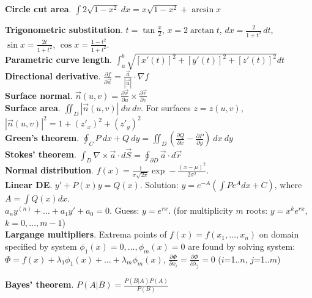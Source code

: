 \documentclass[a4paper, 12pt]{article}
\newcommand{\Topic}[1]{\textbf{#1}}
\begin{document}
\Topic{Circle cut area}.
$\int 2\sqrt{1-x^2}\ dx = x \sqrt{1-x^2} + \arcsin x$

\Topic{Trigonometric substitution}.
$t = \tan \frac{x}{2}$, $x = 2 \arctan t$, $dx = \frac{2}{1 + t^2}\,dt$,
$\sin x = \frac{2t}{1 + t^2}$, $\cos x = \frac{1 - t^2}{1 + t^2}$. \\
\Topic{Parametric curve length}.
$\int_a^b \sqrt{[x'(t)]^2 + [y'(t)]^2 + [z'(t)]^2} dt$ \\
\Topic{Directional derivative}.
$\frac{\partial f}{\partial \vec{a}} = \frac{\vec{a}}{|\vec{a}|} \cdot \nabla f$ \\
\Topic{Surface normal}.
$\vec{n}(u, v) = \frac{\partial \vec{r}}{\partial u} \times
                 \frac{\partial \vec{r}}{\partial v}$ \\
\Topic{Surface area}.
$\iint_D |\vec{n}(u,v)|\ du\ dv$.
For surfaces $z=z(u,v)$, $|\vec{n}(u,v)|^2 = {1 + (z'_x)^2 + (z'_y)^2}$ \\
\Topic{Green's theorem}.
$\oint_C P\ dx + Q\ dy =
\iint_D (\frac{\partial Q}{\partial x} - \frac{\partial P}{\partial y})\ dx\ dy$ \\
\Topic{Stokes' theorem}.
$\int_D \nabla \times \vec{a} \cdot d\vec{S} =
 \oint_{\partial D} \vec{a} \cdot d\vec{r}$ \\
\Topic{Normal distribution}.
$f(x) = \frac{1}{\sigma \sqrt{2\pi}} \exp -\frac{(x - \mu)^2}{2 \sigma^2}$. \\
\Topic{Linear DE}.
$y' + P(x) y = Q(x)$.
Solution: $y = e^{-A} (\int P e^A dx + C)$, where $A = \int Q(x) dx$. \\
$a_n y^{(n)} + \dots + a_1 y' + a_0 = 0$.  Guess: $y=e^{rx}$.
(for multiplicity $m$ roots: $y=x^k e^{rx}$, $k=0,\dots,m-1$) \\
\Topic{Largange multipliers}.
Extrema points of $f(x) = f(x_1, \dots, x_n)$ on domain specified by system
$\phi_1(x) = 0, \dots, \phi_m(x) = 0$ are
found by solving system:
$\Phi = f(x) + \lambda_1 \phi_1(x) + \dots + \lambda_m \phi_m(x)$,
$\frac{\partial \Phi}{\partial x_i} =
  \frac{\partial \Phi}{\partial \lambda_j} = 0$ ($i$=1..$n$, $j$=1..$m$)


\Topic{Bayes' theorem}. $P(A | B) = \frac{P(B | A) P(A)}{P(B)}$
\end{document}
